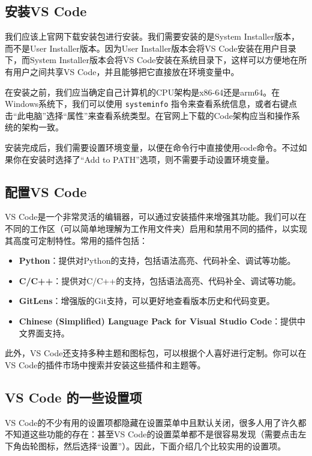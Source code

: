 \subsection{安装VS Code}

我们应该上官网下载安装包进行安装。我们需要安装的是System Installer版本，而不是User Installer版本。因为User Installer版本会将VS Code安装在用户目录下，而System Installer版本会将VS Code安装在系统目录下，这样可以方便地在所有用户之间共享VS Code，并且能够把它直接放在环境变量中。

在安装之前，我们应当确定自己计算机的CPU架构是x86-64还是arm64。在Windows系统下，我们可以使用 \texttt{systeminfo} 指令来查看系统信息，或者右键点击“此电脑”选择“属性”来查看系统类型。在官网上下载的Code架构应当和操作系统的架构一致。

安装完成后，我们需要设置环境变量，以便在命令行中直接使用code命令。不过如果你在安装时选择了“Add to PATH”选项，则不需要手动设置环境变量。

\subsection{配置VS Code}

VS Code是一个非常灵活的编辑器，可以通过安装插件来增强其功能。我们可以在不同的工作区（可以简单地理解为工作用文件夹）启用和禁用不同的插件，以实现其高度可定制特性。常用的插件包括：

\begin{itemize}
  \item \textbf{Python}：提供对Python的支持，包括语法高亮、代码补全、调试等功能。
  \item \textbf{C/C++}：提供对C/C++的支持，包括语法高亮、代码补全、调试等功能。
  \item \textbf{GitLens}：增强版的Git支持，可以更好地查看版本历史和代码变更。
  \item \textbf{Chinese (Simplified) Language Pack for Visual Studio Code}：提供中文界面支持。
\end{itemize}

此外，VS Code还支持多种主题和图标包，可以根据个人喜好进行定制。你可以在VS Code的插件市场中搜索并安装这些插件和主题等。

\subsection{VS Code 的一些设置项}

VS Code的不少有用的设置项都隐藏在设置菜单中且默认关闭，很多人用了许久都不知道这些功能的存在：甚至VS Code的设置菜单都不是很容易发现（需要点击左下角齿轮图标，然后选择“设置”）。因此，下面介绍几个比较实用的设置项。

